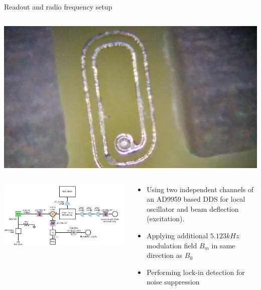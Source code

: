\documentclass[final]{beamer}
\begin{document}
\begin{frame}[fragile]{}
\begin{columns}[T]
\begin{column}{.49\linewidth}
\begin{block}{\large Readout and radio frequency setup}
\begin{columns}
\begin{column}{0.4\columnwidth}
            \includegraphics[width=\columnwidth]{figures/pcb02.jpg}
          \end{column}
        \end{columns}

        \begin{columns}
          \begin{column}{0.6\columnwidth}
            \includegraphics[width=\columnwidth]{figures/rfsetup.png}
          \end{column}
          \begin{column}{0.4\columnwidth}
            \begin{itemize}
              \item Using two independent channels of an AD9959 based DDS for
                  local oscillator and beam deflection (excitation).
              \item Applying additional $5.123 kHz$ modulation field $B_m$ in
                  same direction as $B_0$
              \item Performing lock-in detection for noise suppression
            \end{itemize}
          \end{column}
        \end{columns}
      \end{block}


\end{column}
\end{columns}
\end{frame}
\end{document}
